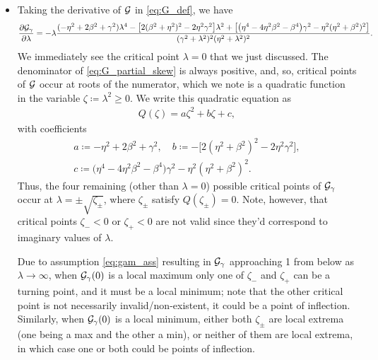 \documentclass[a4paper,10pt]{article}
\begin{document}
{\begin{itemize}
Noting that $\eta^4 > \eta^4 - 4 \eta^2 \beta^2 - \beta^4$, a sufficient condition that $\lambda = 0$ is always a local maximum is thus
\begin{align} \label{eq:suff_0max}
\gamma \leq \eta + \frac{\beta^2}{\eta} < {\cal K}.
\end{align}
Since ${\cal K} > \eta + \beta^2 / \eta$, ${\cal G}_{\gamma}(0) < 1$ when it is a local minimum due to \eqref{eq:G0_sizes}.

\item Taking the derivative of ${\cal G}$ in \eqref{eq:G_def}, we have
\begin{align} \label{eq:G_partial_skew}
\frac{\partial {\cal G}_{\gamma}}{\partial \lambda} 
= 
-\lambda
\frac{
(-\eta^2 + 2 \beta^2 + \gamma^2)\lambda^4 
- \big[ 2(\beta^2 + \eta^2)^2 - 2 \eta^2 \gamma^2  \big] \lambda^2 
+ \big[ \big( \eta^4 - 4 \eta^2 \beta^2 - \beta^4 \big) \gamma^2  - \eta^2 (\eta^2 + \beta^2)^2 \big] }
{(\gamma^2 + \lambda^2)^2 (\eta^2 + \lambda^2)^2}.
\end{align}
We immediately see the critical point $\lambda = 0$ that we just discussed. 
%
The denominator of \eqref{eq:G_partial_skew} is always positive, and, so, critical points of ${\cal G}$ occur at roots of the numerator, which we note is a quadratic function in the variable $\zeta \coloneqq \lambda^2 \geq 0$. We write this quadratic equation as
\begin{align}
\label{eq:Q_def_skew}
Q(\zeta) = a \zeta^2 + b \zeta + c,
\end{align}
with coefficients
\begin{equation}
\begin{gathered}
\label{eq:abc_def}
a \coloneqq -\eta^2 + 2 \beta^2 + \gamma^2, 
\quad
b \coloneqq - \big[ 2(\eta^2 + \beta^2)^2 - 2 \eta^2 \gamma^2  \big], \\
c \coloneqq \big( \eta^4 - 4 \eta^2 \beta^2 - \beta^4 \big) \gamma^2  - \eta^2 (\eta^2 + \beta^2)^2.
\end{gathered}
\end{equation}
Thus, the four remaining (other than $\lambda = 0$) possible critical points of ${\cal G}_{\gamma}$ occur at $\lambda = \pm \sqrt{\zeta_{\pm}}$, where $\zeta_{\pm}$ satisfy $Q(\zeta_{\pm}) = 0$. Note, however, that critical points $\zeta_{-} < 0$ or $\zeta_+ < 0$ are not valid since they'd correspond to imaginary values of $\lambda$.

Due to assumption \eqref{eq:gam_ass} resulting in ${\cal G}_{\gamma}$ approaching 1 from below as $\lambda \to \infty$, when ${\cal G}_{\gamma}(0)$ is a local maximum only one of $\zeta_-$ and $\zeta_+$ can be a turning point, and it must be a local minimum; note that the other critical point is not necessarily invalid/non-existent, it could be a point of inflection. Similarly, when ${\cal G}_{\gamma}(0)$ is a local minimum, either both $\zeta_{\pm}$ are local extrema (one being a max and the other a min), or neither of them are local extrema, in which case one or both could be points of inflection.


\end{itemize}}
\end{document}
